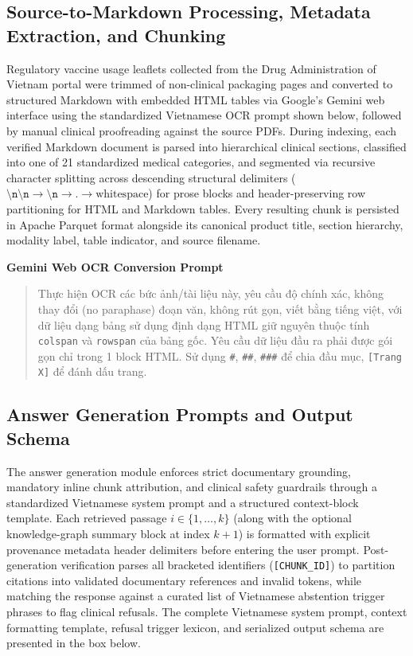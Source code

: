 \documentclass[sn-mathphys, oneside]{sn-jnl}
\newcommand{\vn}[1]{{\fontencoding{T5}\selectfont #1}}
\begin{document}
\subsection{Source-to-Markdown Processing, Metadata Extraction, and Chunking}
\label{app:source_processing}
Regulatory vaccine usage leaflets collected from the Drug Administration of Vietnam portal were trimmed of non-clinical packaging pages and converted to structured Markdown with embedded HTML tables via Google's Gemini web interface using the standardized Vietnamese OCR prompt shown below, followed by manual clinical proofreading against the source PDFs. During indexing, each verified Markdown document is parsed into hierarchical clinical sections, classified into one of 21 standardized medical categories, and segmented via recursive character splitting across descending structural delimiters ($\texttt{\textbackslash n\textbackslash n} \rightarrow \texttt{\textbackslash n} \rightarrow \texttt{.} \rightarrow \text{whitespace}$) for prose blocks and header-preserving row partitioning for HTML and Markdown tables. Every resulting chunk is persisted in Apache Parquet format alongside its canonical product title, section hierarchy, modality label, table indicator, and source filename.

\begin{tcolorbox}[colback=white,colframe=black!65,boxrule=0.6pt,arc=0pt,left=8pt,right=8pt,top=8pt,bottom=8pt]
\textbf{Gemini Web OCR Conversion Prompt}

\medskip
\begin{quote}
\vn{Thực hiện OCR các bức ảnh/tài liệu này, yêu cầu độ chính xác, không thay đổi (no paraphase) đoạn văn, không rút gọn, viết bằng tiếng việt, với dữ liệu dạng bảng sử dụng định dạng HTML giữ nguyên thuộc tính \texttt{colspan} và \texttt{rowspan} của bảng gốc. Yêu cầu dữ liệu đầu ra phải được gói gọn chỉ trong 1 block HTML. Sử dụng \texttt{\#}, \texttt{\#\#}, \texttt{\#\#\#} để chia đầu mục, \texttt{[Trang X]} để đánh dấu trang.}
\end{quote}
\end{tcolorbox}

\subsection{Answer Generation Prompts and Output Schema}
\label{app:generation_prompts}
The answer generation module enforces strict documentary grounding, mandatory inline chunk attribution, and clinical safety guardrails through a standardized Vietnamese system prompt and a structured context-block template. Each retrieved passage $i \in \{1, \dots, k\}$ (along with the optional knowledge-graph summary block at index $k+1$) is formatted with explicit provenance metadata header delimiters before entering the user prompt. Post-generation verification parses all bracketed identifiers (\texttt{[CHUNK\_ID]}) to partition citations into validated documentary references and invalid tokens, while matching the response against a curated list of Vietnamese abstention trigger phrases to flag clinical refusals. The complete Vietnamese system prompt, context formatting template, refusal trigger lexicon, and serialized output schema are presented in the box below.
\end{document}

